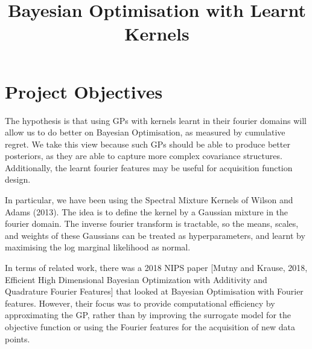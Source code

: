 \documentclass[a4paper]{article}
\title{Bayesian Optimisation with Learnt Kernels}
\begin{document}
\maketitle

\section{Project Objectives}
The hypothesis is that using GPs with kernels learnt in their fourier domains will allow us to do better on Bayesian Optimisation, as measured by cumulative regret.
We take this view because such GPs should be able to produce better posteriors, as they are able to capture more complex covariance structures.
Additionally, the learnt fourier features may be useful for acquisition function design.

In particular, we have been using the Spectral Mixture Kernels of Wilson and Adams (2013).
The idea is to define the kernel by a Gaussian mixture in the fourier domain.
The inverse fourier transform is tractable, so the means, scales, and weights of these Gaussians can be treated as hyperparameters, and learnt by maximising the log marginal likelihood as normal.

In terms of related work, there was a 2018 NIPS paper [Mutny and Krause, 2018, Efficient High Dimensional Bayesian Optimization with Additivity and Quadrature Fourier Features] that looked at Bayesian Optimisation with Fourier features.
However, their focus was to provide computational efficiency by approximating the GP, rather than by improving the surrogate model for the objective function or using the Fourier features for the acquisition of new data points.
\end{document}
